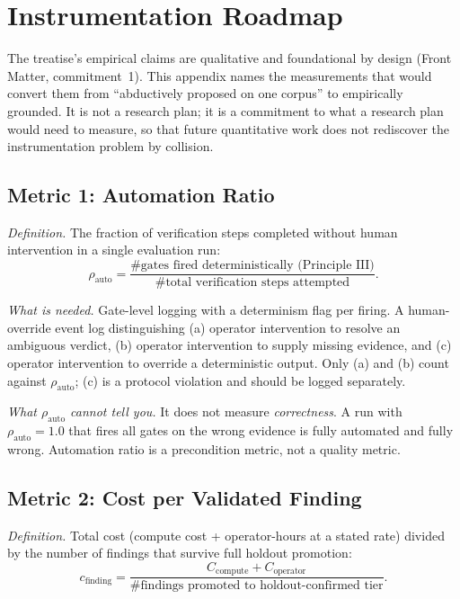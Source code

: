 \documentclass[11pt]{article}
\begin{document}
\section{Instrumentation Roadmap}

The treatise's empirical claims are qualitative and foundational by design (Front Matter, commitment~1). This appendix names the measurements that would convert them from ``abductively proposed on one corpus'' to empirically grounded. It is not a research plan; it is a commitment to what a research plan would need to measure, so that future quantitative work does not rediscover the instrumentation problem by collision.

\subsection*{Metric 1: Automation Ratio}

\emph{Definition.} The fraction of verification steps completed without human intervention in a single evaluation run:
\[
\rho_{\text{auto}} = \frac{\#\text{gates fired deterministically (Principle III)}}{\#\text{total verification steps attempted}}.
\]

\emph{What is needed.} Gate-level logging with a determinism flag per firing. A human-override event log distinguishing (a) operator intervention to resolve an ambiguous verdict, (b) operator intervention to supply missing evidence, and (c) operator intervention to override a deterministic output. Only (a) and (b) count against $\rho_{\text{auto}}$; (c) is a protocol violation and should be logged separately.

\emph{What $\rho_{\text{auto}}$ cannot tell you.} It does not measure \emph{correctness}. A run with $\rho_{\text{auto}} = 1.0$ that fires all gates on the wrong evidence is fully automated and fully wrong. Automation ratio is a precondition metric, not a quality metric.

\subsection*{Metric 2: Cost per Validated Finding}

\emph{Definition.} Total cost (compute cost + operator-hours at a stated rate) divided by the number of findings that survive full holdout promotion:
\[
c_{\text{finding}} = \frac{C_{\text{compute}} + C_{\text{operator}}}{\#\text{findings promoted to holdout-confirmed tier}}.
\]
\end{document}
